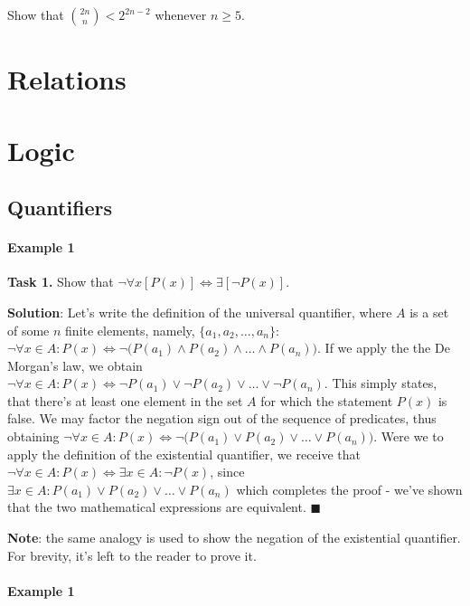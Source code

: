 \documentclass[10pt,a4paper]{article}
\begin{document}
\exercise Show that \(\binom{2n}{n} < 2^{2n-2}\) whenever \(n \geq 5\).

\section{Relations}


\section{Logic}

\subsection{Quantifiers}

\paragraph{Example 1}

\textbf{Task 1.} Show that $\neg \forall x [P(x)] \iff \exists [\neg P(x)]$.

\textbf{Solution}: Let's write the definition of the universal quantifier, where $A$ is a set of some $n$ finite elements,
namely, $\{a_{1}, a_{2}, \dots, a_{n}\}$: $\neg \forall x \in A: P(x) \iff \neg \big( P(a_{1}) \land P(a_{2}) \land \dots \land P(a_{n}) \big)$.
If we apply the the De Morgan's law, we obtain $\neg \forall x \in A: P(x) \iff \neg P(a_{1}) \lor \neg P(a_{2}) \lor \dots \lor \neg P(a_{n})$.
This simply states, that there's at least one element in the set $A$ for which the statement $P(x)$ is false. 
We may factor the negation sign out of the sequence of predicates, thus obtaining $\neg \forall x \in A: P(x) \iff \neg \big( P(a_{1}) \lor P(a_{2}) \lor \dots \lor P(a_{n}) \big)$. 
Were we to apply the definition of the existential quantifier, we receive that $\neg \forall x \in A: P(x) \iff \exists x \in A: \neg P(x)$,
since $\exists x \in A: P(a_{1}) \lor P(a_{2}) \lor \dots \lor P(a_{n})$ which completes the proof - we've shown that the two mathematical expressions are equivalent. $\blacksquare$

\textbf{Note}: the same analogy is used to show the negation of the existential quantifier. For brevity,
it's left to the reader to prove it.


\paragraph{Example 1}
\end{document}
